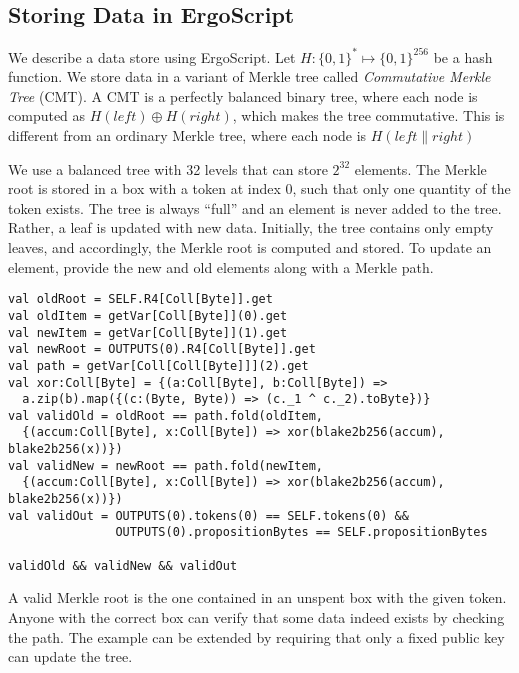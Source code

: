 \documentclass[11pt]{article}
\newcommand{\langname}{ErgoScript\xspace}
\begin{document}
\subsection{Storing Data in \langname}

We describe a data store using \langname. Let $H:\{0, 1\}^* \mapsto \{0, 1\}^{256}$ be a hash function. We store data in a variant of Merkle tree called {\em Commutative Merkle Tree} (CMT). A CMT is a perfectly balanced binary tree, where each node is computed as $H(left) \oplus H(right)$, which makes the tree commutative. This is different from an ordinary Merkle tree, where each node is $H(left \lVert right)$

We use a balanced tree with 32 levels that can store $2^{32}$ elements. The Merkle root is stored in a box with a token at index 0, such that only one quantity of the token exists. The tree is always ``full'' and an element is never added to the tree. Rather, a leaf is updated with new data. Initially, the tree contains only empty leaves, and accordingly, the Merkle root is computed and stored. 
To update an element, provide the new and old elements along with a Merkle path. 

\begin{verbatim}
val oldRoot = SELF.R4[Coll[Byte]].get
val oldItem = getVar[Coll[Byte]](0).get
val newItem = getVar[Coll[Byte]](1).get
val newRoot = OUTPUTS(0).R4[Coll[Byte]].get
val path = getVar[Coll[Coll[Byte]]](2).get
val xor:Coll[Byte] = {(a:Coll[Byte], b:Coll[Byte]) => 
  a.zip(b).map({(c:(Byte, Byte)) => (c._1 ^ c._2).toByte})}  
val validOld = oldRoot == path.fold(oldItem,
  {(accum:Coll[Byte], x:Coll[Byte]) => xor(blake2b256(accum), blake2b256(x))})
val validNew = newRoot == path.fold(newItem,
  {(accum:Coll[Byte], x:Coll[Byte]) => xor(blake2b256(accum), blake2b256(x))})
val validOut = OUTPUTS(0).tokens(0) == SELF.tokens(0) && 
               OUTPUTS(0).propositionBytes == SELF.propositionBytes

validOld && validNew && validOut
\end{verbatim}

A valid Merkle root is the one contained in an unspent box with the given token. Anyone with the correct box can verify that some data indeed exists by checking the path. The example can be extended by requiring that only a fixed public key can update the tree.
\end{document}

